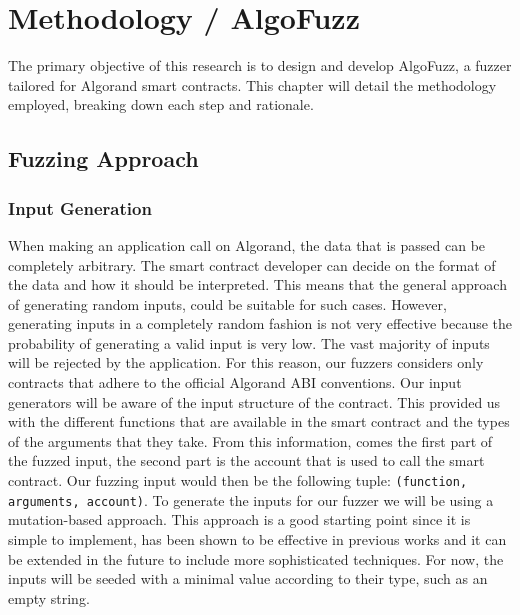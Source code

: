 
\chapter{Methodology / AlgoFuzz}\label{chapter:methodology}
The primary objective of this research is to design and develop AlgoFuzz, a fuzzer tailored for Algorand smart contracts.
This chapter will detail the methodology employed, breaking down each step and rationale.

\section{Fuzzing Approach}

\subsection*{Input Generation}
When making an application call on Algorand, the data that is passed can be completely arbitrary.
The smart contract developer can decide on the format of the data and how it should be interpreted.
This means that the general approach of generating random inputs, could be suitable for such cases.
However, generating inputs in a completely random fashion is not very effective because the probability of generating a valid input is very low.
The vast majority of inputs will be rejected by the application.
For this reason, our fuzzers considers only contracts that adhere to the official Algorand \ac{ABI} conventions.
Our input generators will be aware of the input structure of the contract.
This provided us with the different functions that are available in the smart contract and the types of the arguments that they take.
From this information, comes the first part of the fuzzed input, the second part is the account that is used to call the smart contract.
Our fuzzing input would then be the following tuple: \texttt{(function, arguments, account)}.
To generate the inputs for our fuzzer we will be using a mutation-based approach.
This approach is a good starting point since it is simple to implement, has been shown to be effective in previous works and it can be extended in the future to include more sophisticated techniques.
For now, the inputs will be seeded with a minimal value according to their type, such as an empty string.

